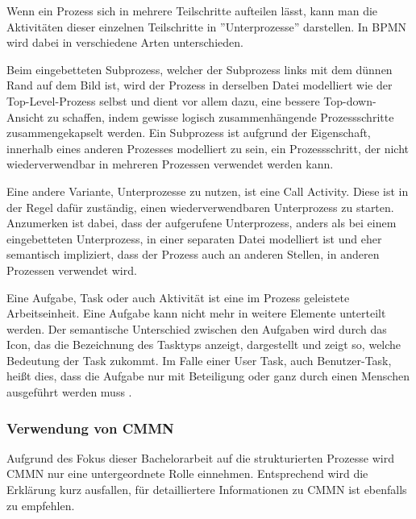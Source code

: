 \clearpage
{}
Wenn ein Prozess sich in mehrere Teilschritte aufteilen lässt, kann man die Aktivitäten dieser einzelnen Teilschritte in ''Unterprozesse'' darstellen. In BPMN wird dabei in verschiedene Arten unterschieden. \citep[vgl.][S. 41]{bruce_bpmn_2012}

Beim eingebetteten Subprozess, welcher der Subprozess links mit dem dünnen Rand auf dem Bild ist, wird der Prozess in derselben Datei modelliert wie der Top-Level-Prozess selbst und dient vor allem dazu, eine bessere Top-down-Ansicht zu schaffen, indem gewisse logisch zusammenhängende Prozessschritte zusammengekapselt werden. Ein Subprozess ist aufgrund der Eigenschaft, innerhalb eines anderen Prozesses modelliert zu sein, ein Prozessschritt, der nicht wiederverwendbar in mehreren Prozessen verwendet werden kann. \citep[vgl.][S. 35, 37f]{bruce_englisch_2011}

Eine andere Variante, Unterprozesse zu nutzen, ist eine Call Activity. Diese ist in der Regel dafür zuständig, einen wiederverwendbaren Unterprozess zu starten. Anzumerken ist dabei, dass der aufgerufene Unterprozess, anders als bei einem eingebetteten Unterprozess, in einer separaten Datei modelliert ist und eher semantisch impliziert, dass der Prozess auch an anderen Stellen, in anderen Prozessen verwendet wird. \citep[vgl.][S. 38f]{bruce_englisch_2011}

Eine Aufgabe, Task oder auch Aktivität ist eine im Prozess geleistete Arbeitseinheit. Eine Aufgabe kann nicht mehr in weitere Elemente unterteilt werden. Der semantische Unterschied zwischen den Aufgaben wird durch das Icon, das die Bezeichnung des Tasktyps anzeigt, dargestellt und zeigt so, welche Bedeutung der Task zukommt. Im Falle einer User Task, auch Benutzer-Task, heißt dies, dass die Aufgabe nur mit Beteiligung oder ganz durch einen Menschen ausgeführt werden muss \citep[vgl.][S. 39ff]{bruce_bpmn_2012}.

\subsubsection{Verwendung von CMMN}

Aufgrund des Fokus dieser Bachelorarbeit auf die strukturierten Prozesse wird \ac{CMMN} nur eine untergeordnete Rolle einnehmen. Entsprechend wird die Erklärung kurz ausfallen, für detailliertere Informationen zu \ac{CMMN} ist ebenfalls \citep{freund_praxishandbuch_2017} zu empfehlen.

